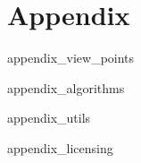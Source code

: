 \chapter{Appendix}
\label{sec:appendix}

 {appendix_view_points}

 {appendix_algorithms}

 {appendix_utils}

 {appendix_licensing} 
